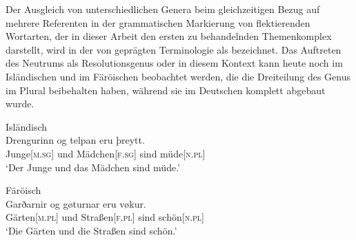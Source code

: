 Der Ausgleich von unterschiedlichen Genera beim gleichzeitigen Bezug
auf mehrere Referenten in der grammatischen Markierung von flektierenden
Wortarten, der in dieser Arbeit den ersten zu behandelnden Themenkomplex
darstellt, wird in der von \citet{corbett1983} geprägten Terminologie als
 bezeichnet. Das Auftreten des Neutrums als
Resolutionsgenus oder  \autocites{corbett1999}{wechsler2009}
in diesem Kontext kann heute noch im Isländischen
 und im Färöischen 
beobachtet werden, die die Dreiteilung des Genus im Plural beibehalten haben,
während sie im Deutschen komplett abgebaut wurde.

\begin{exe}
\ex \label{ex:modgermbeide}
\begin{xlist}
\ex \label{ex:modgermbeide_1}
	\langinfo%
		{Isländisch}%
		{}%
		{\cites[nach][283]{corbett1991}[569]{wechsler2009}}\\
	\gll Drengurinn og telpan eru þreytt. \\
		Junge[\textsc{m.sg}] und Mädchen[\textsc{f.sg}] sind
		müde[\textsc{n.pl}] \\
	\trans `Der Junge und das Mädchen sind müde.'

\ex \label{ex:modgermbeide_2}
	\langinfo%
		{Färöisch}%
		{}%
		{\cite[nach][225]{thrainsson2004}}\\
	\gll Garðarnir og gøturnar eru vøkur. \\
		Gärten[\textsc{m.pl}] und Straßen[\textsc{f.pl}] sind
		schön[\textsc{n.pl}] \\
	\trans `Die Gärten und die Straßen sind schön.'
\end{xlist}
\end{exe}

